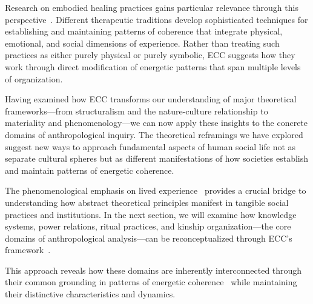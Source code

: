 Research on embodied healing practices gains particular relevance through this perspective~\cite{csordas1994embodiment,desjarlais1992body}. Different therapeutic traditions develop sophisticated techniques for establishing and maintaining patterns of coherence that integrate physical, emotional, and social dimensions of experience. Rather than treating such practices as either purely physical or purely symbolic, ECC suggests how they work through direct modification of energetic patterns that span multiple levels of organization.

Having examined how ECC transforms our understanding of major theoretical frameworks—from structuralism and the nature-culture relationship to materiality and phenomenology—we can now apply these insights to the concrete domains of anthropological inquiry. The theoretical reframings we have explored suggest new ways to approach fundamental aspects of human social life not as separate cultural spheres but as different manifestations of how societies establish and maintain patterns of energetic coherence.

The phenomenological emphasis on lived experience~ provides a crucial bridge to understanding how abstract theoretical principles manifest in tangible social practices and institutions. In the next section, we will examine how knowledge systems, power relations, ritual practices, and kinship organization—the core domains of anthropological analysis—can be reconceptualized through ECC's framework~\cite{foucault1980power,turner1967forest,schneider1984critique}.

This approach reveals how these domains are inherently interconnected through their common grounding in patterns of energetic coherence~ while maintaining their distinctive characteristics and dynamics.
